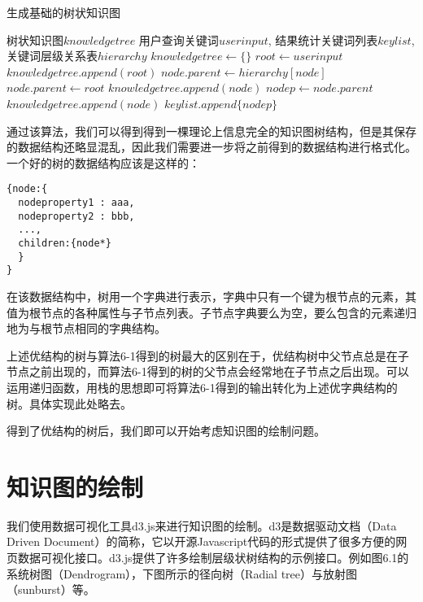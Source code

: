 \begin{algorithm}
\caption{生成基础的树状知识图}
\label{getrawtree}
\begin{algorithmic}[1] %
\Ensure 树状知识图$knowledgetree$ %
\Require 用户查询关键词$userinput$, 结果统计关键词列表$keylist$, 关键词层级关系表$hierarchy$ %
\State $knowledgetree \gets \{\}$
\State $root \gets userinput$
\State $knowledgetree.append(root)$
  \State $node.parent \gets hierarchy[node]$
    \State $node.parent \gets root$
    \State $knowledgetree.append(node)$
  \EndIf
    \State $nodep \gets node.parent$
    \State $knowledgetree.append(node)$
    \State $keylist.append\{nodep\}$
  \EndIf
\EndFor
\end{algorithmic}
\end{algorithm}

通过该算法，我们可以得到得到一棵理论上信息完全的知识图树结构，但是其保存的数据结构还略显混乱，因此我们需要进一步将之前得到的数据结构进行格式化。一个好的树的数据结构应该是这样的：

\begin{lstlisting}[caption={树数据结构}, label=treestructure, escapeinside="", numbers=none]
{node:{
  nodeproperty1 : aaa,
  nodeproperty2 : bbb,
  ...,
  children:{node*}
  }
}
\end{lstlisting}

在该数据结构中，树用一个字典进行表示，字典中只有一个键为根节点的元素，其值为根节点的各种属性与子节点列表。子节点字典要么为空，要么包含的元素递归地为与根节点相同的字典结构。

上述优结构的树与算法6-1得到的树最大的区别在于，优结构树中父节点总是在子节点之前出现的，而算法6-1得到的树的父节点会经常地在子节点之后出现。可以运用递归函数，用栈的思想即可将算法6-1得到的输出转化为上述优字典结构的树。具体实现此处略去。

得到了优结构的树后，我们即可以开始考虑知识图的绘制问题。

\section{知识图的绘制}
我们使用数据可视化工具d3.js来进行知识图的绘制。d3是数据驱动文档（Data Driven Document）的简称，它以开源Javascript代码的形式提供了很多方便的网页数据可视化接口。d3.js提供了许多绘制层级状树结构的示例接口。例如图6.1的系统树图（Dendrogram），下图所示的径向树（Radial tree）与放射图（sunburst）等。

